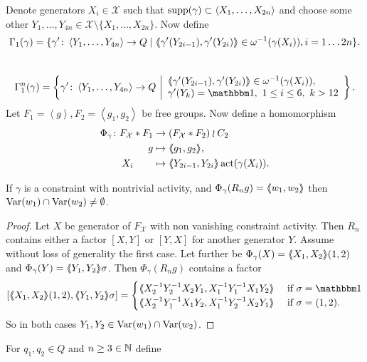 \documentclass[a4paper,11pt]{amsart}
\newcommand\replaceTh[2]{\st{#1}{\color{DeepPink1}\ #2}}
\newcommand\remove[1]{{\color{Tomato1}#1}}
\begin{document}
 Denote generators $X_i\in\mathcal{X}$ such that $\operatorname{{supp}}(\gamma) \subset \left<X_1,\dotsc,X_{2n}\right>$ and choose some 
 other $Y_1,\dotsc,Y_{4n} \in\mathcal{X} \setminus \{X_1,\dotsc,X_{2n}\}$. 
 Now define
 \remove{\[\Gamma_1(\gamma) = \{\gamma' \colon \left< Y_1,\ldots ,Y_{4n}\right> \to Q \mid \langle\negthickspace\langle\gamma'(Y_{2i-1}),\gamma'(Y_{2i})\rangle\negthickspace\rangle\in \omega^{-1}(\gamma(X_i)),i=1\ldots2n\}.\] }
 \replaceTh{}{
 \[\Gamma_1^n(\gamma) = \left \{\gamma' 
  \colon \left< Y_1,\ldots ,Y_{4n}\right> \to Q \bigmid
  \begin{array}{l}
   \pair{\gamma'(Y_{2i-1}),\gamma'(Y_{2i})}\in \omega^{-1}(\gamma(X_i)),\ \\
   \gamma'(Y_k) = \id,\ 1\leq i\leq 6,\ k>12
    \end{array} \right\}.\]}
 Let $F_1=\left<g\right>,F_2=\left<g_1,g_2\right>$ be free groups. 
 Now define a homomorphism  
 \begin{align*}
  \Phi_{\gamma}\colon F_{\mathcal{X}}*F_1 &\to (F_{\mathcal{X}}*F_2)\wr C_2 \\ g&\mapsto \langle\negthickspace\langle g_1,g_2\rangle\negthickspace\rangle,\\ X_i\qquad &\mapsto \langle\negthickspace\langle Y_{2i-1},Y_{2i}\rangle\negthickspace\rangle\operatorname{act}(\gamma(X_i)).
 \end{align*}
\begin{lem} \label{lem:commonVar}
 If $\gamma$ is a constraint with nontrivial activity, and $\Phi_\gamma(R_ng)=\langle\negthickspace\langle w_1,w_2\rangle\negthickspace\rangle$ 
 then $\textup{Var}(w_1)\cap\textup{Var}(w_2)\neq \emptyset$.
\end{lem}
\begin{proof}
 Let $X$ be generator of $F_{\mathcal{X}}$ with non vanishing constraint activity. 
 Then $R_n$ contains either a factor $[X,Y]$ or $[Y,X]$ for another generator $Y$. 
 Assume without loss of generality the first case. Let further be 
 $\Phi_\gamma(X)=\langle\negthickspace\langle X_1,X_2\rangle\negthickspace\rangle(1,2)$ and $\Phi_\gamma(Y)=\langle\negthickspace\langle Y_1,Y_2\rangle\negthickspace\rangle\sigma$. 
 Then $\Phi_\gamma(R_n g)$ contains a factor 
 \[ [\pair{X_1,X_2}(1,2),\pair{Y_1,Y_2}\sigma] = \begin{cases}
                                                   \pair{X_2^{-1}Y_2^{-1}X_2Y_1,X_1^{-1}Y_1^{-1}X_1Y_2} & \textup{ if } \sigma=\id \\
                                                   \pair{X_2^{-1}Y_1^{-1}X_1Y_2,X_1^{-1}Y_2^{-1}X_2Y_1} & \textup{ if } \sigma=(1,2) . \\
                                                 \end{cases}
\] So in both cases $Y_1,Y_2\in \textup{Var}(w_1)\cap \textup{Var}(w_2)$. 
\end{proof}
For $q_1,q_2 \in Q$ and $n\geq3\in \mathbb{N}$ define
\end{document}
